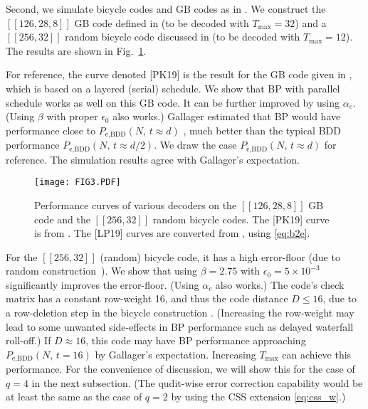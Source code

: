 \documentclass{ieeeaccess}
\theoremstyle{definition}		%
\begin{document}
Second, we simulate bicycle codes \cite{MMM04} and GB codes \cite{KP13} as in \cite[Fig.~5]{PK19}.
We construct the $[[126,28,8]]$ GB code defined in \cite{PK19} (to be decoded with ${T_{\max}=32}$) and a $[[256,32]]$ random  bicycle code discussed in \cite{KL20} (to be decoded with ${T_{\max}=12}$).
The results are shown in Fig.~\ref{fig:bic}.


For reference, the curve denoted [PK19] is the result for the GB code given in \cite{PK19}, which is based on a layered (serial) schedule. 
We show that BP with parallel schedule works as well on this GB code. 
It can be further improved by using $\alpha_c$. (Using $\beta$ with proper $\epsilon_0$ also works.)
%
Gallager estimated that BP would have  performance close to ${ P_\text{e,BDD}(N,\,t\approx d) }$ \cite{Gal63}, 
much better than the typical BDD performance $ P_\text{e,BDD}(N,\,t\approx d/2) $. 
We draw the case $ P_\text{e,BDD}(N,\,t\approx d) $ for reference. 
The simulation results agree with Gallager's expectation.


\begin{figure} 
	\centering \texttt{[image: FIG3.PDF]}
	\caption{Performance curves of various decoders on the $[[126,28,8]]$ GB code and the $[[256,32]]$ random bicycle codes. 
		The [PK19] curve  is from \cite{PK19}.
		The [LP19] curves  are converted from \cite{LP19},  using \eqref{eq:b2e}.
	} \label{fig:bic}
\end{figure}


 
For the $[[256,32]]$ (random) bicycle code, it has a high error-floor \cite{KL20} (due to random construction~\cite{KL20b}). 
We show that using ${\beta=2.75}$ with ${\epsilon_0=5\times10^{-3}}$ significantly improves the error-floor. (Using $\alpha_c$ also works.)
The code's check matrix has a constant row-weight 16, and thus the code distance $D\le 16$, due to a row-deletion step in the bicycle construction \cite{MMM04}.
(Increasing the row-weight may lead to some unwanted side-effects in BP performance such as delayed waterfall roll-off\cite[Fig.~6]{MMM04}.)
If $D\approx 16$, this code may have BP performance approaching ${P_\text{e,BDD}(N,\,t=16)}$ by Gallager's expectation. 
Increasing $T_{\max}$ can achieve this performance.
For the convenience of discussion, we will show this for the case of $q=4$ in the next subsection.
%
(The qudit-wise error correction capability would be  at least the same as  the case of $q=2$ by using the CSS extension \eqref{eq:css_w}.)
\end{document}
